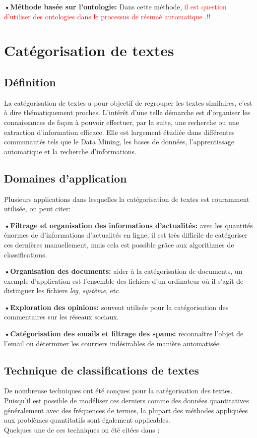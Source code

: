         \textbf{•Méthode basée sur l'ontologie:} Dans cette méthode, \textcolor{red}{il est question d'utiliser des ontologies dans le processus de résumé automatique \cite{ram}.!!}
 
        

\section{Catégorisation de textes}
    \subsection{Définition}
    La catégorisation de textes a pour objectif de regrouper les textes similaires, c'est à dire thématiquement proches. L'intérêt d'une telle démarche est d'organiser les connaissances de façon à pouvoir effectuer, par la suite, une recherche ou une extraction d'information efficace. Elle est largement étudiée dans différentes communautés tels que le Data Mining, les bases de données, l'apprentissage automatique et la recherche d'informations.

    \subsection{Domaines d'application}
    Plusieurs applications dans lesquelles la catégorisation de textes est couramment utilisée, on peut citer:

    \textbf{•Filtrage et organisation des informations d'actualités:} avec les quantités énormes de d'informations d'actualités en ligne, il est très difficile de catégoriser ces dernières manuellement, mais cela est possible grâce aux algorithmes de classifications. 

    \textbf{•Organisation des documents:} aider à la catégorisation de documents, un exemple d'application est l'ensemble des fichiers d'un ordinateur où il s'agit de distinguer les fichiers \emph{log}, \emph{système}, etc.

    \textbf{•Exploration des opinions:} souvent utilisée pour la catégorisation des commentaires sur les réseaux sociaux.

    \textbf{•Catégorisation des emails et filtrage des spams:} reconnaître l'objet de l'email ou déterminer les courriers indésirables de manière automatisée.
     
    \subsection{Technique de classifications de textes}
    De nombreuse techniques ont été conçues pour la catégorisation des textes. Puisqu'il est possible de modéliser ces derniers comme des données quantitatives généralement avec des fréquences de termes, la plupart des méthodes appliquées aux problèmes quantitatifs sont également applicables.\\    
    Quelques une de ces techniques on été citées dans \cite{stca}:


